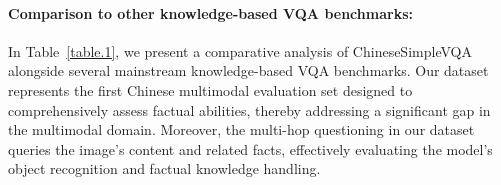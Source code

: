 \paragraph{Comparison to other knowledge-based VQA benchmarks:}
In Table~\ref{table.1}, we present a comparative analysis of ChineseSimpleVQA alongside several mainstream knowledge-based VQA benchmarks. Our dataset represents the first Chinese multimodal evaluation set designed to comprehensively assess factual abilities, thereby addressing a significant gap in the multimodal domain.
Moreover, the multi-hop questioning in our dataset queries the image's content and related facts, effectively evaluating the model's object recognition and factual knowledge handling.


